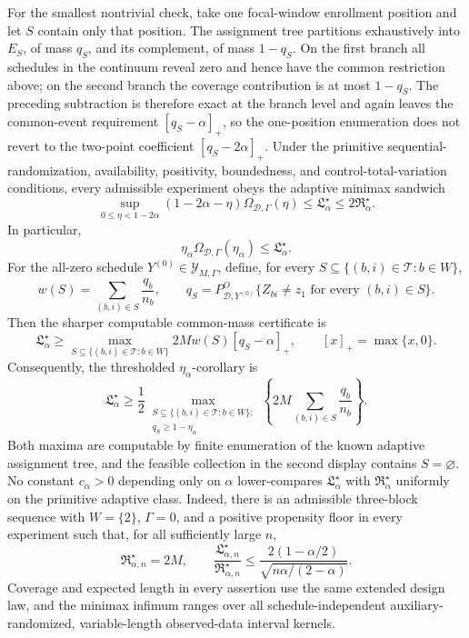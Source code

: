 For the smallest nontrivial check, take one focal-window enrollment position and let \(S\) contain only that position.  The assignment tree partitions exhaustively into \(E_S\), of mass \(q_S\), and its complement, of mass \(1-q_S\).  On the first branch all schedules in the continuum reveal zero and hence have the common restriction above; on the second branch the coverage contribution is at most \(1-q_S\).  The preceding subtraction is therefore exact at the branch level and again leaves the common-event requirement \([q_S-\alpha]_+\), so the one-position enumeration does not revert to the two-point coefficient \([q_S-2\alpha]_+\).
Under the primitive sequential-randomization, availability, positivity, boundedness, and control-total-variation conditions, every admissible experiment obeys the adaptive minimax sandwich
\[
 \sup_{0\le\eta<1-2\alpha}
 (1-2\alpha-\eta)\Omega_{\mathcal D,\Gamma}(\eta)
 \le \mathfrak L_\alpha^\star
 \le2\mathfrak R_\alpha^\star.
\]
In particular,
\[
 \eta_\alpha\Omega_{\mathcal D,\Gamma}(\eta_\alpha)
 \le\mathfrak L_\alpha^\star.
\]
For the all-zero schedule \(Y^{(0)}\in\mathcal Y_{M,\Gamma}\), define, for every \(S\subseteq\{(b,i)\in\mathcal T:b\in W\}\),
\[
 w(S)=\sum_{(b,i)\in S}\frac{q_b}{n_b},
 \qquad
 q_S=P^O_{\mathcal D,Y^{(0)}}\{Z_{bi}\ne z_1\text{ for every }(b,i)\in S\}.
\]
Then the sharper computable common-mass certificate is
\[
 \mathfrak L_\alpha^\star
 \ge
 \max_{S\subseteq\{(b,i)\in\mathcal T:b\in W\}}
 2Mw(S)[q_S-\alpha]_+,
 \qquad [x]_+=\max\{x,0\}.
\]
Consequently, the thresholded \(\eta_\alpha\)-corollary is
\[
 \mathfrak L_\alpha^\star
 \ge \frac12
 \max_{\substack{S\subseteq\{(b,i)\in\mathcal T:b\in W\}:\\
 q_S\ge1-\eta_\alpha}}
 \left\{2M\sum_{(b,i)\in S}\frac{q_b}{n_b}\right\}.
\]
Both maxima are computable by finite enumeration of the known adaptive assignment tree, and the feasible collection in the second display contains \(S=\varnothing\).  No constant \(c_\alpha>0\) depending only on \(\alpha\) lower-compares \(\mathfrak L_\alpha^\star\) with \(\mathfrak R_\alpha^\star\) uniformly on the primitive adaptive class.  Indeed, there is an admissible three-block sequence with \(W=\{2\}\), \(\Gamma=0\), and a positive propensity floor in every experiment such that, for all sufficiently large \(n\),
\[
 \mathfrak R_{\alpha,n}^\star=2M,
 \qquad
 \frac{\mathfrak L_{\alpha,n}^\star}{\mathfrak R_{\alpha,n}^\star}
 \le
 \frac{2(1-\alpha/2)}{\sqrt{n\alpha/(2-\alpha)}}.
\]
Coverage and expected length in every assertion use the same extended design law, and the minimax infimum ranges over all schedule-independent auxiliary-randomized, variable-length observed-data interval kernels.
